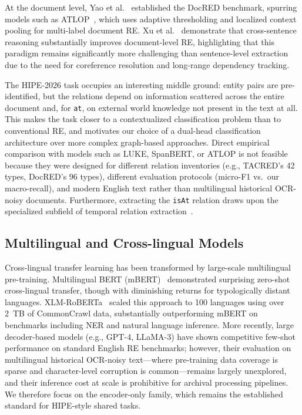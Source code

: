 \documentclass[11pt,a4paper]{article}
\begin{document}
At the document level, Yao et al.~\cite{yao2019} established the DocRED benchmark, spurring models such as ATLOP~\cite{zhou2021}, which uses adaptive thresholding and localized context pooling for multi-label document RE. Xu et al.~\cite{lyu2024} demonstrate that cross-sentence reasoning substantially improves document-level RE, highlighting that this paradigm remains significantly more challenging than sentence-level extraction due to the need for coreference resolution and long-range dependency tracking.

The HIPE-2026 task occupies an interesting middle ground: entity pairs are pre-identified, but the relations depend on information scattered across the entire document and, for \texttt{at}, on external world knowledge not present in the text at all. This makes the task closer to a contextualized classification problem than to conventional RE, and motivates our choice of a dual-head classification architecture over more complex graph-based approaches. Direct empirical comparison with models such as LUKE, SpanBERT, or ATLOP is not feasible because they were designed for different relation inventories (e.g., TACRED's 42 types, DocRED's 96 types), different evaluation protocols (micro-F1 vs.\ our macro-recall), and modern English text rather than multilingual historical OCR-noisy documents. Furthermore, extracting the \texttt{isAt} relation draws upon the specialized subfield of temporal relation extraction~\cite{ning2018,mathur2021}.

\subsection{Multilingual and Cross-lingual Models}

Cross-lingual transfer learning has been transformed by large-scale multilingual pre-training. Multilingual BERT (mBERT)~\cite{devlin2019,pires2019,wu2020} demonstrated surprising zero-shot cross-lingual transfer, though with diminishing returns for typologically distant languages. XLM-RoBERTa~\cite{conneau2020} scaled this approach to 100 languages using over 2~TB of CommonCrawl data, substantially outperforming mBERT on benchmarks including NER and natural language inference. More recently, large decoder-based models (e.g., GPT-4, LLaMA-3) have shown competitive few-shot performance on standard English RE benchmarks; however, their evaluation on multilingual historical OCR-noisy text---where pre-training data coverage is sparse and character-level corruption is common---remains largely unexplored, and their inference cost at scale is prohibitive for archival processing pipelines. We therefore focus on the encoder-only family, which remains the established standard for HIPE-style shared tasks.
\end{document}
